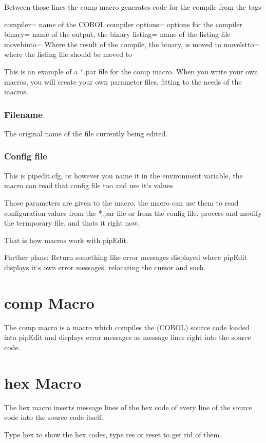 \documentclass{report}
\begin{document}
Between those lines the comp macro generates code for the compile from the tags

compiler=
name of the COBOL compiler
options=
options for the compiler
binary=
name of the output, the binary
listing=
name of the listing file
movebinto=
Where the result of the compile, the binary, is moved to
movelstto=
where the listing file should be moved to


This is an example of a *.par file for the comp macro.
When you write your own macros, you will create your own parameter files, fitting to the needs of the macros.

\subsection{Filename}
The original name of the file currently being edited.

\subsection{Config file}
This is pipedit.cfg, or however you name it in the environment variable, the macro can read that config file too and use it‘s values.


Those parameters are given to the macro, the macro can use them to read configuration values from the *.par file or from the config file, process and modify the termporary file, and thats it right now.

That is how macros work with pipEdit.

Further plans: Return something like error messages displayed where pipEdit 
displays it‘s own error messages, relocating the cursor and such.

\chapter{comp Macro}
The comp macro is a macro which compiles the (COBOL) source code loaded into pipEdit and displays error messages as message lines right into the source code.



\chapter{hex Macro}

The hex macro inserts message lines of the hex code of every line of the source code into the source code itself.

Type hex to show the hex codes, type res or reset to get rid of them.
\end{document}

